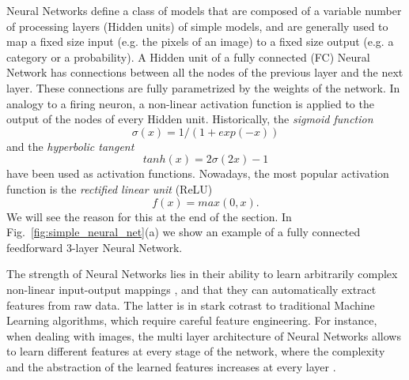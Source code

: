 Neural Networks define a class of models that are composed of a variable number of processing layers (Hidden units) of simple models, and are generally used to map a fixed size input (e.g. the pixels of an image) to a fixed size output (e.g. a category or a probability). A Hidden unit of a fully connected (FC) Neural Network has connections between all the nodes of the previous layer and the next layer. These connections are fully parametrized by the weights of the network. In analogy to a firing neuron, a non-linear activation function is applied to the output of the nodes of every Hidden unit. Historically, the \textit{sigmoid function}
$$\sigma(x) = 1/(1 + exp(-x))$$
and the \textit{hyperbolic tangent}
$$tanh(x) = 2\sigma(2x) - 1$$ 
have been used as activation functions. Nowadays, the most popular activation function is the \textit{rectified linear unit} (ReLU)
$$f(x) = max(0,x).$$
We will see the reason for this at the end of the section. 
In Fig.~\ref{fig:simple_neural_net}(a) we show an example of a fully connected feedforward 3-layer Neural Network. 

The strength of Neural Networks lies in their ability to learn arbitrarily complex non-linear input-output mappings \parencite{cybenko1989}, and that they can automatically extract features from raw data. The latter is in stark cotrast to traditional Machine Learning algorithms, which require careful feature engineering. For instance, when dealing with images, the multi layer architecture of Neural Networks allows to learn different features at every stage of the network, where the complexity and the abstraction of the learned features increases at every layer \parencite{farabet2013}.

